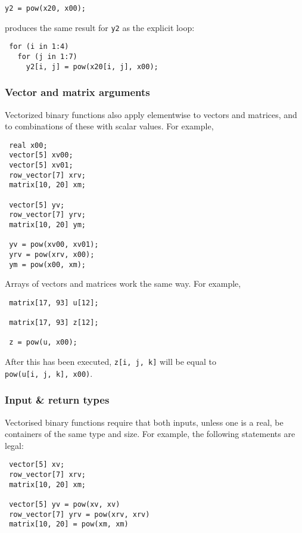 \documentclass[
  10pt,
]{book}
\begin{document}
\begin{verbatim}
y2 = pow(x20, x00);
\end{verbatim}

produces the same result for \texttt{y2} as the explicit loop:

\begin{verbatim}
 for (i in 1:4)
   for (j in 1:7)
     y2[i, j] = pow(x20[i, j], x00);
\end{verbatim}

\hypertarget{vector-and-matrix-arguments-1}{%
\subsubsection{Vector and matrix arguments}\label{vector-and-matrix-arguments-1}}

Vectorized binary functions also apply elementwise to vectors and matrices,
and to combinations of these with scalar values.
For example,

\begin{verbatim}
 real x00;
 vector[5] xv00;
 vector[5] xv01;
 row_vector[7] xrv;
 matrix[10, 20] xm;
 
 vector[5] yv;
 row_vector[7] yrv;
 matrix[10, 20] ym;
 
 yv = pow(xv00, xv01);
 yrv = pow(xrv, x00);
 ym = pow(x00, xm);
\end{verbatim}

Arrays of vectors and matrices work the same way. For example,

\begin{verbatim}
 matrix[17, 93] u[12];
 
 matrix[17, 93] z[12];
 
 z = pow(u, x00);
\end{verbatim}

After this has been executed, \texttt{z{[}i,\ j,\ k{]}} will be equal to \texttt{pow(u{[}i,\ j,\ k{]},\ x00)}.

\hypertarget{input-return-types}{%
\subsubsection{Input \& return types}\label{input-return-types}}

Vectorised binary functions require that both inputs, unless one is a real,
be containers of the same type and size. For example, the following statements
are legal:

\begin{verbatim}
 vector[5] xv;
 row_vector[7] xrv;
 matrix[10, 20] xm;
 
 vector[5] yv = pow(xv, xv)
 row_vector[7] yrv = pow(xrv, xrv)
 matrix[10, 20] = pow(xm, xm)
\end{verbatim}
\end{document}
